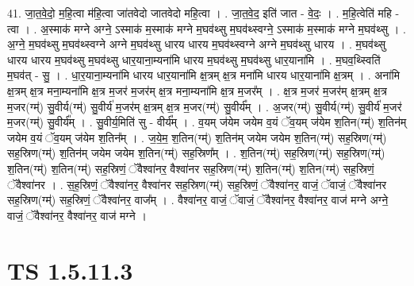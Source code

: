 \documentclass[17pt]{extarticle}
\begin{document}
41. जा॒त॒वे॒दो॒ म॒हि॒त्वा म॑हि॒त्वा जा॑तवेदो जातवेदो महि॒त्वा । . जा॒त॒वे॒द॒ इति॑ जात - वे॒दः॒ । . म॒हि॒त्वेति॑ महि - त्वा । . अ॒स्माक॑ मग्ने अग्ने॒ ऽस्माक॑ म॒स्माक॑ मग्ने म॒घव॑थ्सु म॒घव॑थ्स्वग्ने॒ ऽस्माक॑ म॒स्माक॑ मग्ने म॒घव॑थ्सु । . अ॒ग्ने॒ म॒घव॑थ्सु म॒घव॑थ्स्वग्ने अग्ने म॒घव॑थ्सु धारय धारय म॒घव॑थ्स्वग्ने अग्ने म॒घव॑थ्सु धारय । . म॒घव॑थ्सु धारय धारय म॒घव॑थ्सु म॒घव॑थ्सु धार॒याना॒म्यना॑मि धारय म॒घव॑थ्सु म॒घव॑थ्सु धार॒याना॑मि । . म॒घव॒थ्स्विति॑ म॒घव॑त् - सु॒ । . धा॒र॒याना॒म्यना॑मि धारय धार॒याना॑मि क्ष॒त्रम् क्ष॒त्र मना॑मि धारय धार॒याना॑मि क्ष॒त्रम् । . अना॑मि क्ष॒त्रम् क्ष॒त्र मना॒म्यना॑मि क्ष॒त्र म॒जर॑ म॒जर॑म् क्ष॒त्र मना॒म्यना॑मि क्ष॒त्र म॒जर᳚म् । . क्ष॒त्र म॒जर॑ म॒जर॑म् क्ष॒त्रम् क्ष॒त्र म॒जर(ग्म्॑) सु॒वीर्य(ग्म्॑) सु॒वीर्य॑ म॒जर॑म् क्ष॒त्रम् क्ष॒त्र म॒जर(ग्म्॑) सु॒वीर्य᳚म् । . अ॒जर(ग्म्॑) सु॒वीर्य(ग्म्॑) सु॒वीर्य॑ म॒जर॑ म॒जर(ग्म्॑) सु॒वीर्य᳚म् । . सु॒वीर्य॒मिति॑ सु - वीर्य᳚म् । . व॒यम् ज॑येम जयेम व॒यं ॅव॒यम् ज॑येम श॒तिन(ग्म्॑) श॒तिन॑म् जयेम व॒यं ॅव॒यम् ज॑येम श॒तिन᳚म् । . ज॒ये॒म॒ श॒तिन(ग्म्॑) श॒तिन॑म् जयेम जयेम श॒तिन(ग्म्॑) सह॒स्रिण(ग्म्॑) सह॒स्रिण(ग्म्॑) श॒तिन॑म् जयेम जयेम श॒तिन(ग्म्॑) सह॒स्रिण᳚म् । . श॒तिन(ग्म्॑) सह॒स्रिण(ग्म्॑) सह॒स्रिण(ग्म्॑) श॒तिन(ग्म्॑) श॒तिन(ग्म्॑) सह॒स्रिणं॒ ॅवैश्वा॑नर॒ वैश्वा॑नर सह॒स्रिण(ग्म्॑) श॒तिन(ग्म्॑) श॒तिन(ग्म्॑) सह॒स्रिणं॒ ॅवैश्वा॑नर । . स॒ह॒स्रिणं॒ ॅवैश्वा॑नर॒ वैश्वा॑नर सह॒स्रिण(ग्म्॑) सह॒स्रिणं॒ ॅवैश्वा॑नर॒ वाजं॒ ॅवाजं॒ ॅवैश्वा॑नर सह॒स्रिण(ग्म्॑) सह॒स्रिणं॒ ॅवैश्वा॑नर॒ वाज᳚म् । . वैश्वा॑नर॒ वाजं॒ ॅवाजं॒ ॅवैश्वा॑नर॒ वैश्वा॑नर॒ वाज॑ मग्ने अग्ने॒ वाजं॒ ॅवैश्वा॑नर॒ वैश्वा॑नर॒ वाज॑ मग्ने । \newline
\pagebreak
{}

\section{ TS 1.5.11.3 }
\end{document}
